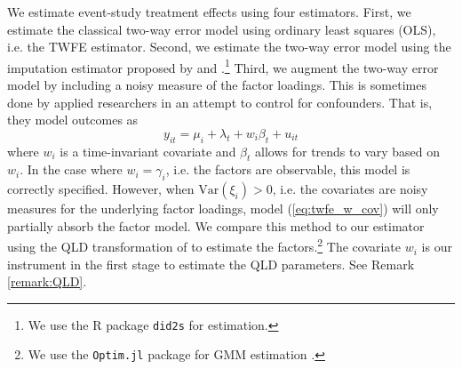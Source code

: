 We estimate event-study treatment effects using four estimators. First, we estimate the classical two-way error model using ordinary least squares (OLS), i.e. the TWFE estimator. Second, we estimate the two-way error model using the imputation estimator proposed by \citet{Borusyak_Jaravel_Spiess_2021} and \citet{Gardner_2021}.\footnote{We use the R package \texttt{did2s} \citep{butts2022did2s} for estimation.} Third, we augment the two-way error model by including a noisy measure of the factor loadings. This is sometimes done by applied researchers in an attempt to control for confounders. That is, they model outcomes as 
\begin{equation}\label{eq:twfe_w_cov}
  y_{it} = \mu_i + \lambda_t + w_i \beta_t + u_{it}
\end{equation}
where $w_i$ is a time-invariant covariate and $\beta_t$ allows for trends to vary based on $w_i$. In the case where $w_i = \gamma_i$, i.e. the factors are observable, this model is correctly specified. However, when $\text{Var}(\xi_i) > 0$, i.e. the covariates are noisy measures for the underlying factor loadings, model (\ref{eq:twfe_w_cov}) will only partially absorb the factor model. We compare this method to our estimator using the QLD transformation of \citet{Ahn_Lee_Schmidt_2013} to estimate the factors.\footnote{We use the \texttt{Optim.jl} package for GMM estimation \citep{mogensen2018optim}.} The covariate $w_i$ is our instrument in the first stage to estimate the QLD parameters. See Remark \ref{remark:QLD}.

